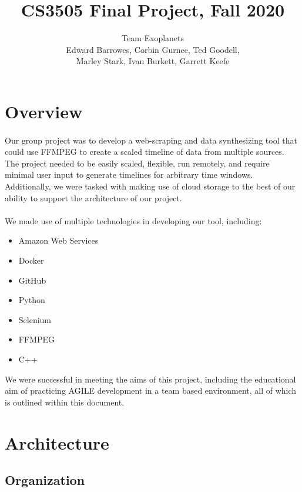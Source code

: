 \documentclass{article}
\begin{document}
\title{CS3505 Final Project, Fall 2020}
\author{Team Exoplanets\\Edward Barrowes, Corbin Gurnee, Ted Goodell,\\Marley Stark, Ivan Burkett, Garrett Keefe}
\maketitle
\thispagestyle{empty} %
\newpage

\section{Overview}
  \paragraph{}
  Our group project was to develop a web-scraping and data synthesizing tool that could use FFMPEG to create a scaled timeline of data from multiple sources. The project needed to be easily scaled, flexible, run remotely, and require minimal user input to generate timelines for arbitrary time windows. Additionally, we were tasked with making use of cloud storage to the best of our ability to support the architecture of our project.
  \paragraph{}
  We made use of multiple technologies in developing our tool, including:
  \begin{itemize}
    \item Amazon Web Services
    \item Docker
    \item GitHub
    \item Python
    \item Selenium
    \item FFMPEG
    \item C++
  \end{itemize}
  We were successful in meeting the aims of this project, including the educational aim of practicing AGILE development in a team based environment, all of which is outlined within this document.
\section{Architecture}
  \subsection{Organization}
\end{document}
